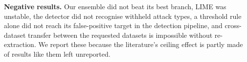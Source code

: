 \noindent\textbf{Negative results.} Our ensemble did not beat its best branch, LIME was unstable, the detector did not recognise withheld attack types, a threshold rule alone did not reach its false-positive target in the detection pipeline, and cross-dataset transfer between the requested datasets is impossible without re-extraction. We report these because the literature's ceiling effect is partly made of results like them left unreported.
